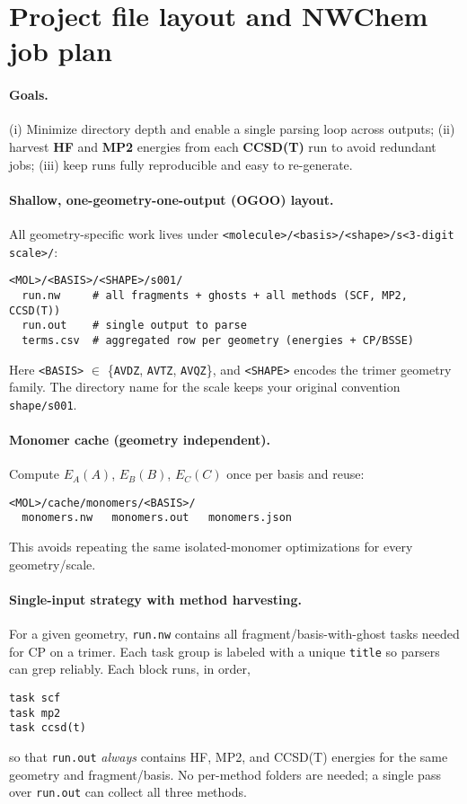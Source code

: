 
\section{Project file layout and NWChem job plan}
\label{sec:files}

\paragraph{Goals.}
(i) Minimize directory depth and enable a single parsing loop across outputs;
(ii) harvest \textbf{HF} and \textbf{MP2} energies from each \textbf{CCSD(T)} run to avoid redundant jobs;
(iii) keep runs fully reproducible and easy to re-generate.

\paragraph{Shallow, one-geometry-one-output (OGOO) layout.}
All geometry-specific work lives under
\texttt{\textless molecule\textgreater/\textless basis\textgreater/\textless shape\textgreater/s\textless 3-digit scale\textgreater/}:
\begin{verbatim}
<MOL>/<BASIS>/<SHAPE>/s001/
  run.nw     # all fragments + ghosts + all methods (SCF, MP2, CCSD(T))
  run.out    # single output to parse
  terms.csv  # aggregated row per geometry (energies + CP/BSSE)
\end{verbatim}
Here \texttt{<BASIS>} $\in$ \{\texttt{AVDZ}, \texttt{AVTZ}, \texttt{AVQZ}\}, and \texttt{<SHAPE>} encodes the trimer geometry family.
The directory name for the scale keeps your original convention \texttt{shape/s001}.

\paragraph{Monomer cache (geometry independent).}
Compute $E_A(A)$, $E_B(B)$, $E_C(C)$ once per basis and reuse:
\begin{verbatim}
<MOL>/cache/monomers/<BASIS>/
  monomers.nw   monomers.out   monomers.json
\end{verbatim}
This avoids repeating the same isolated-monomer optimizations for every geometry/scale.

\paragraph{Single-input strategy with method harvesting.}
For a given geometry, \texttt{run.nw} contains all fragment/basis-with-ghost tasks needed for CP on a trimer. Each task group is labeled with a unique \texttt{title} so parsers can grep reliably.
Each block runs, in order,
\begin{verbatim}
task scf
task mp2
task ccsd(t)
\end{verbatim}
so that \texttt{run.out} \emph{always} contains HF, MP2, and CCSD(T) energies for the same geometry and fragment/basis.
No per-method folders are needed; a single pass over \texttt{run.out} can collect all three methods.


